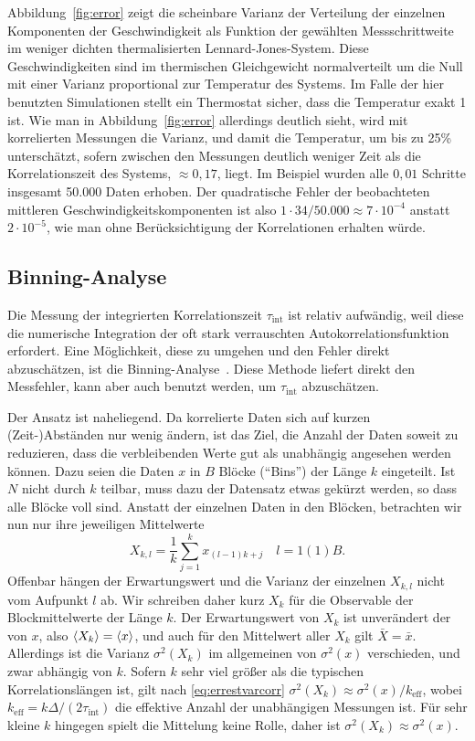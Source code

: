 Abbildung~\ref{fig:error} zeigt die scheinbare Varianz der Verteilung
der einzelnen Komponenten der Geschwindigkeit als Funktion der
gewählten Messschrittweite im weniger dichten thermalisierten
Lennard-Jones-System. Diese Geschwindigkeiten sind im thermischen
Gleichgewicht normalverteilt um die Null mit einer Varianz
proportional zur Temperatur des Systems. Im Falle der hier benutzten
Simulationen stellt ein Thermostat sicher, dass die Temperatur exakt 1
ist. Wie man in Abbildung~\ref{fig:error} allerdings deutlich sieht,
wird mit korrelierten Messungen die Varianz, und damit die Temperatur,
um bis zu 25\% unterschätzt, sofern zwischen den Messungen deutlich
weniger Zeit als die Korrelationszeit des Systems, $\approx 0,17$,
liegt. Im Beispiel wurden alle $0,01$ Schritte insgesamt 50.000 Daten
erhoben. Der quadratische Fehler der beobachteten mittleren
Geschwindigkeitskomponenten ist also $1\cdot 34/50.000 \approx 7\cdot
10^{-4}$ anstatt $2\cdot 10^{-5}$, wie man ohne Berücksichtigung der
Korrelationen erhalten würde.

\subsection{Binning-Analyse}

Die Messung der integrierten Korrelationszeit $\tau_\text{int}$
ist relativ aufwändig, weil diese die numerische Integration der oft
stark verrauschten Autokorrelationsfunktion erfordert. Eine
Möglichkeit, diese zu umgehen und den Fehler direkt abzuschätzen, ist
die Binning-Analyse~\cite{janke02a}. Diese Methode liefert direkt den
Messfehler, kann aber auch benutzt werden, um $\tau_\text{int}$
abzuschätzen.

Der Ansatz ist naheliegend. Da korrelierte Daten sich auf kurzen
(Zeit-)Abständen nur wenig ändern, ist das Ziel, die Anzahl der Daten
soweit zu reduzieren, dass die verbleibenden Werte gut als unabhängig
angesehen werden können.  Dazu seien die Daten $x$ in $B$ Blöcke
(\enquote{Bins}) der Länge $k$ eingeteilt. Ist $N$ nicht durch $k$
teilbar, muss dazu der Datensatz etwas gekürzt werden, so dass alle
Blöcke voll sind. Anstatt der einzelnen Daten in den Blöcken,
betrachten wir nun nur ihre jeweiligen Mittelwerte
\begin{equation}
  X_{k,l} = \frac{1}{k}\sum_{j=1}^{k}x_{(l-1)k + j}\quad l=1(1)B.
\end{equation}
Offenbar hängen der Erwartungswert und die Varianz der einzelnen
$X_{k,l}$ nicht vom Aufpunkt $l$ ab. Wir schreiben daher kurz $X_k$
für die Observable der Blockmittelwerte der Länge $k$.  Der
Erwartungswert von $X_k$ ist unverändert der von $x$, also $\left\langle{X_k}\right\rangle
= \left\langle{x}\right\rangle$, und auch für den Mittelwert aller $X_k$ gilt $\bar{X} =
\bar{x}$. Allerdings ist die Varianz $\sigma^2(X_{k})$ im allgemeinen
von $\sigma^2(x)$ verschieden, und zwar abhängig von $k$. Sofern $k$
sehr viel größer als die typischen Korrelationslängen ist, gilt nach
\eqref{eq:errestvarcorr} $\sigma^2(X_{k}) \approx
\sigma^2(x)/k_\text{eff}$, wobei $k_\text{eff} = k \Delta /
(2\tau_\text{int})$ die effektive Anzahl der unabhängigen Messungen
ist. Für sehr kleine $k$ hingegen spielt die Mittelung keine Rolle,
daher ist $\sigma^2(X_{k}) \approx \sigma^2(x)$.

